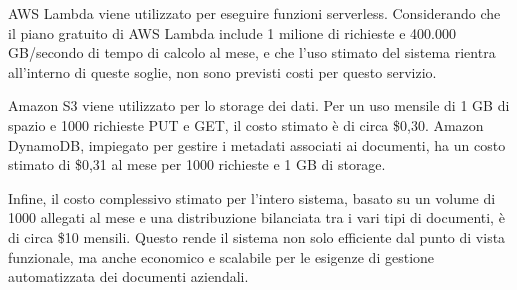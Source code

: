 AWS Lambda viene utilizzato per eseguire funzioni serverless. Considerando che il piano gratuito di AWS Lambda include 1 milione di richieste e 400.000 GB/secondo di tempo di calcolo al mese, e che l'uso stimato del sistema rientra all'interno di queste soglie, non sono previsti costi per questo servizio.

Amazon S3 viene utilizzato per lo storage dei dati. Per un uso mensile di 1 GB di spazio e 1000 richieste PUT e GET, il costo stimato è di circa \$0,30. Amazon DynamoDB, impiegato per gestire i metadati associati ai documenti, ha un costo stimato di \$0,31 al mese per 1000 richieste e 1 GB di storage.

Infine, il costo complessivo stimato per l'intero sistema, basato su un volume di 1000 allegati al mese e una distribuzione bilanciata tra i vari tipi di documenti, è di circa \$10 mensili. Questo rende il sistema non solo efficiente dal punto di vista funzionale, ma anche economico e scalabile per le esigenze di gestione automatizzata dei documenti aziendali.

%
%
%
%
%
%
%
%
%
%
